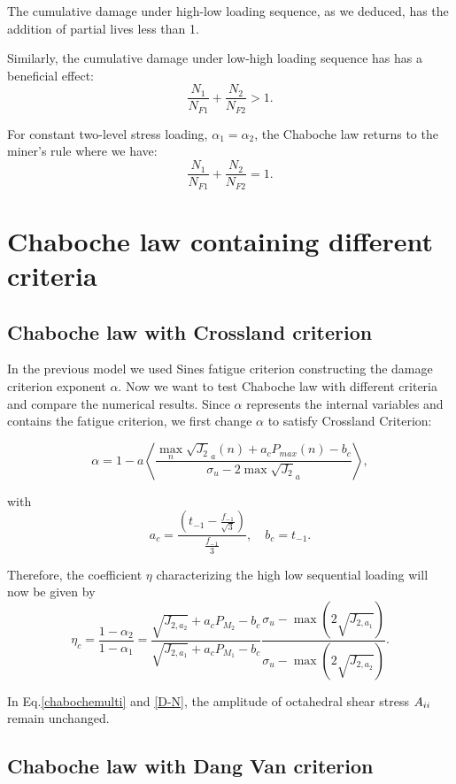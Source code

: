 The cumulative damage under high-low loading sequence, as we deduced, has the addition of partial lives less than 1. 

Similarly, the cumulative damage under low-high loading sequence has has a beneficial effect: 
$$\frac{N_1}{N_{F1}}+\frac{N_2}{N_{F2}}>1.$$

For constant two-level stress loading, $\alpha_1=\alpha_2$, the Chaboche law returns to the miner's rule where we have:
$$\frac{N_1}{N_{F1}}+\frac{N_2}{N_{F2}}=1.$$
\section{Chaboche law containing different criteria}
\subsection{Chaboche law with Crossland criterion}

In the previous model we used Sines fatigue criterion constructing the damage criterion exponent $\alpha$. Now we want to test Chaboche law with different criteria and compare the numerical results. Since $\alpha$ represents the internal variables and contains the fatigue criterion, we first change $\alpha$ to satisfy Crossland Criterion:

\begin{equation}\alpha = 1 - a\left\langle \frac{\max\limits_{n}\sqrt{J_2}_a(n)+a_c{P_{max}(n)}-b_c}{ \sigma_{u} - 2\max\sqrt{J_2}_a}\right\rangle,\end{equation}

with
\begin{equation}
a_c=\frac{(t_{-1}-\frac{f_{-1}}{\sqrt{3}})}{\frac{f_{-1}}{3}}, \quad 
b_c=t_{-1}.
\end{equation}

Therefore, the coefficient $\eta$ characterizing the high low sequential loading will now be given by
\begin{equation}\eta_c=\frac{1-\alpha_2}{1-\alpha_1}=
\frac{\sqrt{J_{2,a_2}}+a_cP_{M_2}-b_c}{\sqrt{J_{2,a_1}}+a_cP_{M_1}-b_c}\frac{ \sigma_{u} - \max(2\sqrt{J_{2,a_1}})}{  \sigma_{u} - \max(2\sqrt{J_{2,a_2}})}.
\end{equation}

In Eq.\eqref{chabochemulti} and \eqref{D-N}, the amplitude of octahedral shear stress $A_{\uppercase\expandafter{\romannumeral2}}$ remain unchanged.

\subsection{Chaboche law with Dang Van criterion}


